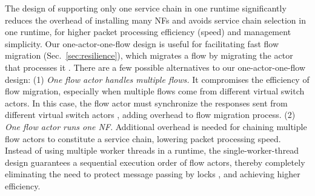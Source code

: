 \vspace{1mm}
 The design of supporting only one service chain in one runtime significantly reduces the overhead of installing many NFs and avoids service chain selection in one runtime, for higher packet processing efficiency (speed) and management simplicity. Our one-actor-one-flow design is useful for facilitating fast flow migration (Sec.~\ref{sec:resilience}), which migrates a flow by migrating the actor that processes it . There are a few possible alternatives to our one-actor-one-flow design: (1) {\em One flow actor handles multiple flows.} It compromises the efficiency of flow migration, especially when multiple flows come from different virtual switch actors. In this case, the flow actor must synchronize the responses sent from different virtual switch actors , adding overhead to flow migration process. (2) {\em One flow actor runs one NF}. Additional overhead is needed for chaining multiple flow actors to constitute a service chain, lowering packet processing speed. %
Instead of using multiple worker threads in a runtime, the single-worker-thread design guarantees a sequential execution order of flow actors, thereby completely eliminating the need to protect message passing by locks , and achieving higher efficiency. 








